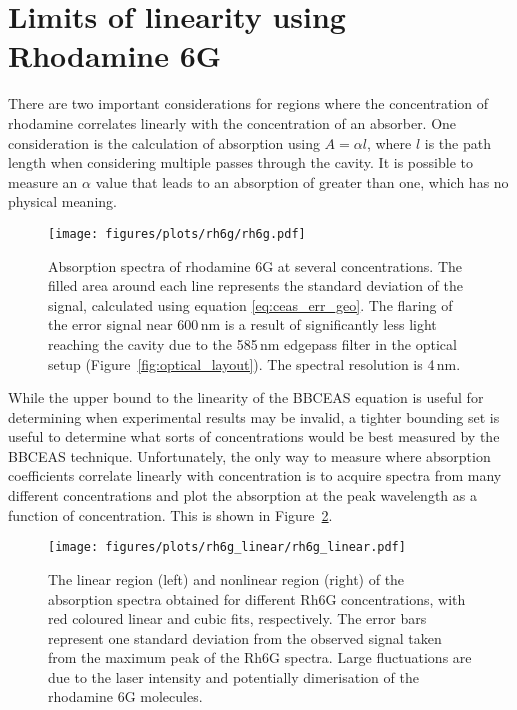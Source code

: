 \section{Limits of linearity using Rhodamine 6G}\label{sec:rhodamine}

There are two important considerations for regions where the concentration
of rhodamine correlates linearly with the concentration of an absorber. One
consideration is the calculation of absorption using $A = \alpha l$, where $l$
is the path length when considering multiple passes through the cavity. It is
possible to measure an $\alpha$ value that leads to an absorption of greater
than one, which has no physical meaning.

\begin{figure}
\begin{center}
  \texttt{[image: figures/plots/rh6g/rh6g.pdf]}
\end{center}
\caption[Rhodamine 6G Absorption Spectra as a Calibration]{Absorption spectra of rhodamine 6G at several concentrations. The filled area around each line represents the standard deviation of the signal, calculated using equation \eqref{eq:ceas_err_geo}. The flaring of the error signal near 600\,nm is a result of significantly less light reaching the cavity due to the 585\,nm edgepass filter in the optical setup (Figure~\ref{fig:optical_layout}). The spectral resolution is 4\,nm.}
\label{fig:rh6g}
\end{figure}


While the upper bound to the linearity of the \ac{BBCEAS} equation is useful
for determining when experimental results may be invalid, a tighter bounding
set is useful to determine what sorts of concentrations would be best
measured by the \ac{BBCEAS} technique. Unfortunately, the only way to measure
where absorption coefficients correlate linearly with concentration is to
acquire spectra from many different concentrations and plot the absorption
at the peak wavelength as a function of concentration. This is shown in
Figure~\ref{fig:rh6g_lin}.

\begin{figure}[th]
\begin{center}
  \texttt{[image: figures/plots/rh6g\_linear/rh6g\_linear.pdf]}
\end{center}
\caption[Dynamic Range of Rhodamine 6G Measurements with \ac{BBCEAS}]{The linear region (left) and nonlinear region (right) of the absorption spectra obtained for different Rh6G concentrations, with red coloured linear and cubic fits, respectively. The error bars represent one standard deviation from the observed signal taken from the maximum peak of the Rh6G spectra. Large fluctuations are due to the laser intensity and potentially dimerisation of the rhodamine 6G molecules.}
\label{fig:rh6g_lin}
\end{figure}

